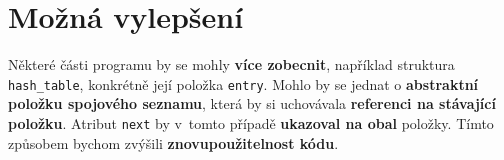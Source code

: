 \documentclass[12pt]{report}
\begin{document}
	\section{Možná vylepšení}
	Některé části programu by se mohly \textbf{více zobecnit}, například struktura \texttt{hash\_table}, konkrétně její položka \texttt{entry}. Mohlo by se jednat o \textbf{abstraktní položku spojového seznamu}, která by si uchovávala \textbf{referenci na stávající položku}. Atribut \texttt{next} by v~tomto případě \textbf{ukazoval na obal} položky. Tímto způsobem bychom zvýšili \textbf{znovupoužitelnost kódu}.
\end{document}
